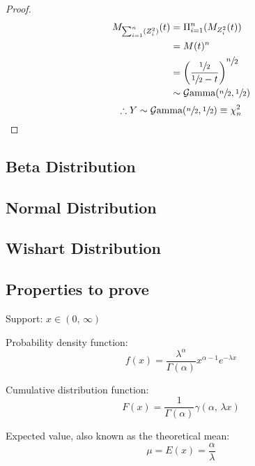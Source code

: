\documentclass[12pt]{article}
\newcommand{\G}{\mathcal{G}}
\begin{document}
\begin{proof}
\begin{equation}
			\begin{split}
				M_{\sum^n_{i=1}(Z^2_i)}(t)	&=	\Pi^n_{i=1}(M_{Z^2_i}(t))\\
											&=	M(t)^n\\
											&=	\left(\frac{\sfrac{1}{2}}{\sfrac{1}{2}-t}\right)^{\displaystyle\sfrac{n}{2}}\\
											&\sim \G\text{amma}(\sfrac{n}{2}, \sfrac{1}{2})
			\end{split}
		\end{equation}
		\begin{equation*}
			\therefore Y\sim\G\text{amma}(\sfrac{n}{2}, \sfrac{1}{2})\equiv \chi^2_n
		\end{equation*}
	\end{proof}


\subsection{Beta Distribution}
\subsection{Normal Distribution}
\subsection{Wishart Distribution}




\pagebreak
\subsection{Properties to prove}
\noindent Support: $x\in (0,\,\infty)$

\noindent Probability density function:
\begin{equation}\label{eq:gamma-pdf-2}
	f(x) = \frac{\lambda^\alpha}{\Gamma(\alpha)}x^{\alpha-1}e^{-\lambda x}
\end{equation}

\noindent Cumulative distribution function:
\begin{equation}\label{eq:gamma-cdf-2}
	F(x) = \frac{1}{\Gamma(\alpha)}\gamma(\alpha,\, \lambda x)
\end{equation}

\noindent Expected value, also known as the theoretical mean:
\begin{equation}\label{eq:gamma-expected-value-2}
	\mu = E(x) = \frac{\alpha}{\lambda}
\end{equation}
\end{document}
